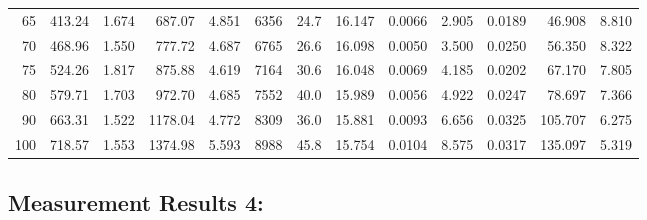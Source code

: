 \documentclass[10pt]{article}
\begin{document}
{\begin{tabular}{|r|rr|rr|rr|rr|rr|r|r|}
       65 &       413.24 &        1.674 &       687.07 &        4.851 &         6356 &         24.7 &       16.147 &       0.0066 &        2.905 &       0.0189 &       46.908 &        8.810 \\
       70 &       468.96 &        1.550 &       777.72 &        4.687 &         6765 &         26.6 &       16.098 &       0.0050 &        3.500 &       0.0250 &       56.350 &        8.322 \\
       75 &       524.26 &        1.817 &       875.88 &        4.619 &         7164 &         30.6 &       16.048 &       0.0069 &        4.185 &       0.0202 &       67.170 &        7.805 \\
       80 &       579.71 &        1.703 &       972.70 &        4.685 &         7552 &         40.0 &       15.989 &       0.0056 &        4.922 &       0.0247 &       78.697 &        7.366 \\
       90 &       663.31 &        1.522 &      1178.04 &        4.772 &         8309 &         36.0 &       15.881 &       0.0093 &        6.656 &       0.0325 &      105.707 &        6.275 \\
      100 &       718.57 &        1.553 &      1374.98 &        5.593 &         8988 &         45.8 &       15.754 &       0.0104 &        8.575 &       0.0317 &      135.097 &        5.319 \\
\hline
\end{tabular}
}



\subsection*{\large \bf Measurement Results 4:}
\end{document}
